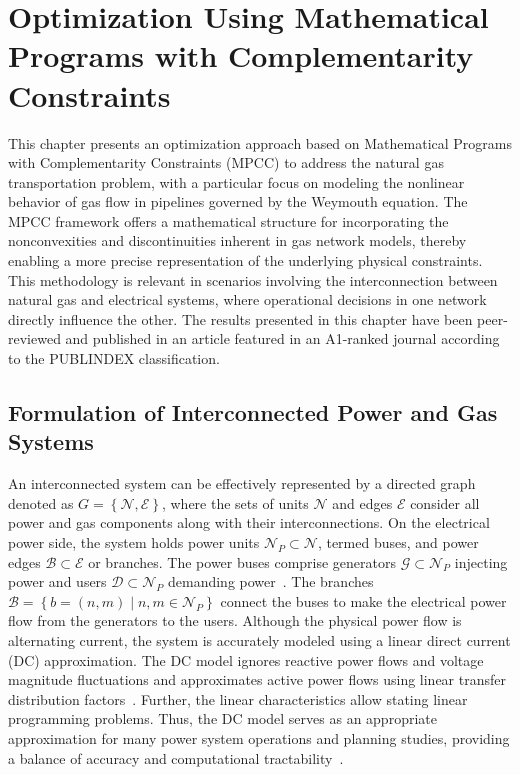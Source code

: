 \chapter{Optimization Using Mathematical Programs with Complementarity Constraints} \label{cap:optimization_mpcc}

This chapter presents an optimization approach based on Mathematical Programs with Complementarity Constraints (MPCC) to address the natural gas transportation problem, with a particular focus on modeling the nonlinear behavior of gas flow in pipelines governed by the Weymouth equation. The MPCC framework offers a mathematical structure for incorporating the nonconvexities and discontinuities inherent in gas network models, thereby enabling a more precise representation of the underlying physical constraints. This methodology is relevant in scenarios involving the interconnection between natural gas and electrical systems, where operational decisions in one network directly influence the other. The results presented in this chapter have been peer-reviewed and published in an article featured in an A1-ranked journal according to the PUBLINDEX classification.

\section{Formulation of Interconnected Power and Gas Systems} \label{sec:formulation}


An interconnected system can be effectively represented by a directed graph denoted as $ G = \left\lbrace\mathcal{N}, \mathcal{E}\right\rbrace$, where the sets of units $\mathcal{N}$ and edges $\mathcal{E}$ consider all power and gas components along with their interconnections. On the electrical power side, the system holds power units $\mathcal{N}_P\subset\mathcal{N}$, termed buses, and power edges $\mathcal{B}\subset\mathcal{E}$ or branches. The power buses comprise generators $\mathcal{G}\subset\mathcal{N}_P$ injecting power and users $\mathcal{D}\subset\mathcal{N}_P$ demanding power~\cite{WANG2019113410}. The branches $\mathcal{B} = \left\{b=(n,m) \mid n,m\in\mathcal{N}_P \right\}$ connect the buses to make the electrical power flow from the generators to the users. Although the physical power flow is alternating current, the system is accurately modeled using a linear direct current (DC) approximation. The DC model ignores reactive power flows and voltage magnitude fluctuations and approximates active power flows using linear transfer distribution factors~\cite{DC_flow}. Further, the linear characteristics allow stating linear programming problems. Thus, the DC model serves as an appropriate approximation for many power system operations and planning studies, providing a balance of accuracy and computational tractability~\cite{DC_flow2}. 

